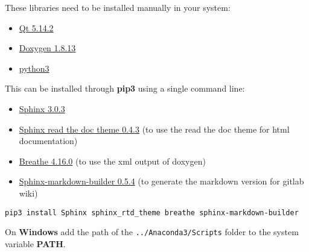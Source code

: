 
These libraries need to be installed manually in your system:

\begin{itemize}
      \tightlist
      \item
            \href{https://www.qt.io/}{Qt 5.14.2}
      \item
            \href{http://www.doxygen.nl/download.html}{Doxygen 1.8.13}
      \item
            \href{https://www.anaconda.com/products/individual}{python3}
\end{itemize}

This can be installed through \textbf{pip3} using a single command line:

\begin{itemize}
      \tightlist
      \item
            \href{https://pypi.org/project/Sphinx/}{Sphinx 3.0.3}
      \item
            \href{https://sphinx-rtd-theme.readthedocs.io/en/stable/}{Sphinx read
                  the doc theme 0.4.3} (to use the read the doc theme for html
            documentation)
      \item
            \href{https://pypi.org/project/breathe/}{Breathe 4.16.0} (to use the
            xml output of doxygen)
      \item
            \href{https://pypi.org/project/sphinx-markdown-builder/}{Sphinx-markdown-builder
                  0.5.4} (to generate the markdown version for gitlab wiki)
\end{itemize}

\texttt{pip3\ install\ Sphinx\ sphinx\_rtd\_theme\ breathe\ sphinx-markdown-builder}

On \textbf{Windows} add the path of the \texttt{../Anaconda3/Scripts} folder to the system variable \textbf{PATH}.


